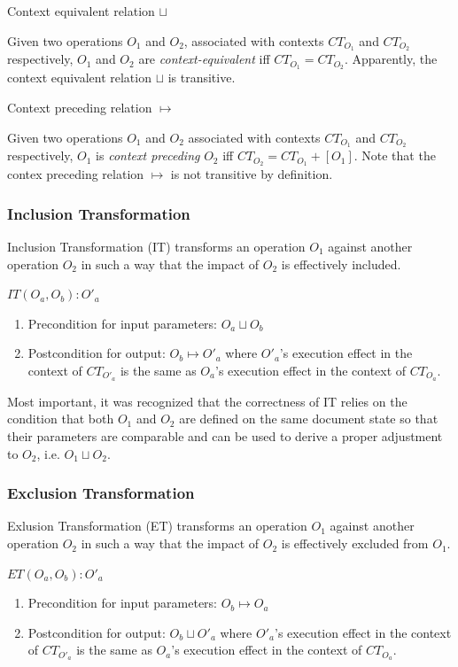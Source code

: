 \documentclass[11pt,a4paper]{article}
\begin{document}
\begin{defn}
Context equivalent relation $\sqcup$
\end{defn}

Given two operations $O_{1}$ and $O_{2}$, associated with contexts $CT_{O_{1}}$ and $CT_{O_{2}}$ respectively, $O_{1}$ and $O_{2}$ are \emph{context-equivalent} iff $CT_{O_{1}}=CT_{O_{2}}$. Apparently, the context equivalent relation $\sqcup$ is transitive.

\begin{defn}
Context preceding relation $\mapsto$
\end{defn}
Given two operations $O_{1}$ and $O_{2}$ associated with contexts $CT_{O_{1}}$ and $CT_{O_{2}}$ respectively, $O_{1}$ is \emph{context preceding} $O_{2}$ iff $CT_{O_{2}}=CT_{O_{1}} + [O_{1}]$. Note that the contex preceding relation $\mapsto$ is not transitive by definition.

\subsubsection{Inclusion Transformation}
Inclusion Transformation (IT) transforms an operation $O_{1}$ against another operation $O_{2}$ in such a way that the impact of $O_{2}$ is effectively included. 
\begin{spec}
$IT(O_a,O_b):O'_a$
\end{spec}
\begin{enumerate}
 \item Precondition for input parameters: $O_a \sqcup O_b$
 \item Postcondition for output: $O_b \mapsto O'_a$ where $O'_a$'s execution effect in the context of $CT_{O'_a}$ is the same as $O_a$'s execution effect in the context of $CT_{O_a}$.
\end{enumerate}

Most important, it was recognized that the correctness of IT relies on the condition that both $O_{1}$ and $O_{2}$ are defined on the same document state so that their parameters are comparable and can be used to derive a proper adjustment to $O_{2}$, i.e. $O_{1} \sqcup O_{2}$.

\subsubsection{Exclusion Transformation}
Exlusion Transformation (ET) transforms an operation $O_{1}$ against another operation $O_{2}$ in such a way that the impact of $O_{2}$ is effectively excluded from $O_{1}$.
\begin{spec}
$ET(O_a,O_b):O'_a$
\end{spec}
\begin{enumerate}
 \item Precondition for input parameters: $O_b \mapsto O_a$
 \item Postcondition for output: $O_b \sqcup O'_a$ where $O'_a$'s execution effect in the context of $CT_{O'_a}$ is the same as $O_a$'s execution effect in the context of $CT_{O_a}$.
\end{enumerate}
\end{document}
